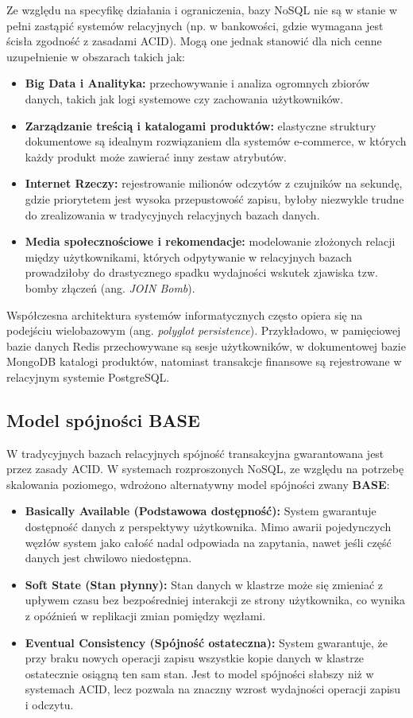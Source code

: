 Ze względu na specyfikę działania i ograniczenia, bazy NoSQL nie są w stanie w pełni zastąpić systemów relacyjnych (np. w bankowości, gdzie wymagana jest ścisła zgodność z zasadami ACID). Mogą one jednak stanowić dla nich cenne uzupełnienie w obszarach takich jak:
\begin{itemize}
    \item \textbf{Big Data i Analityka:} przechowywanie i analiza ogromnych zbiorów danych, takich jak logi systemowe czy zachowania użytkowników.
    \item \textbf{Zarządzanie treścią i katalogami produktów:} elastyczne struktury dokumentowe są idealnym rozwiązaniem dla systemów e-commerce, w których każdy produkt może zawierać inny zestaw atrybutów.
    \item \textbf{Internet Rzeczy:} rejestrowanie milionów odczytów z czujników na sekundę, gdzie priorytetem jest wysoka przepustowość zapisu, byłoby niezwykle trudne do zrealizowania w tradycyjnych relacyjnych bazach danych.
    \item \textbf{Media społecznościowe i rekomendacje:} modelowanie złożonych relacji między użytkownikami, których odpytywanie w relacyjnych bazach prowadziłoby do drastycznego spadku wydajności wskutek zjawiska tzw. bomby złączeń (ang. \emph{JOIN Bomb}).
\end{itemize}
Współczesna architektura systemów informatycznych często opiera się na podejściu wielobazowym (ang. \emph{polyglot persistence}). Przykładowo, w pamięciowej bazie danych Redis przechowywane są sesje użytkowników, w dokumentowej bazie MongoDB katalogi produktów, natomiast transakcje finansowe są rejestrowane w relacyjnym systemie PostgreSQL.

\subsection{Model spójności BASE}
W tradycyjnych bazach relacyjnych spójność transakcyjna gwarantowana jest przez zasady ACID. W systemach rozproszonych NoSQL, ze względu na potrzebę skalowania poziomego, wdrożono alternatywny model spójności zwany \textbf{BASE}:
\begin{itemize}
    \item \textbf{Basically Available (Podstawowa dostępność):} System gwarantuje dostępność danych z perspektywy użytkownika. Mimo awarii pojedynczych węzłów system jako całość nadal odpowiada na zapytania, nawet jeśli część danych jest chwilowo niedostępna.
    \item \textbf{Soft State (Stan płynny):} Stan danych w klastrze może się zmieniać z upływem czasu bez bezpośredniej interakcji ze strony użytkownika, co wynika z opóźnień w replikacji zmian pomiędzy węzłami.
    \item \textbf{Eventual Consistency (Spójność ostateczna):} System gwarantuje, że przy braku nowych operacji zapisu wszystkie kopie danych w klastrze ostatecznie osiągną ten sam stan. Jest to model spójności słabszy niż w systemach ACID, lecz pozwala na znaczny wzrost wydajności operacji zapisu i odczytu.
\end{itemize}

